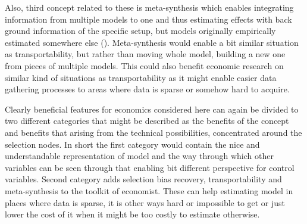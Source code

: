 \documentclass[main=english,12pt,a4paper,pdftex,econ,utf8]{aaltothesis}
\begin{document}
Also, third concept related to these is meta-synthesis which enables integrating information from multiple models to one and thus estimating effects with back ground information of the specific setup, but models originally empirically estimated somewhere else (\cite{Pearl2012a}). Meta-synthesis would enable a bit similar situation as transportability, but rather than moving whole model, building a new one from pieces of multiple models. This could also benefit economic research on similar kind of situations as transportability as it might enable easier data gathering processes to areas where data is sparse or somehow hard to acquire.

Clearly beneficial features for economics considered here can again be divided to two different categories that might be described as the benefits of the concept and benefits that arising from the technical possibilities, concentrated around the selection nodes. In short the first category would contain the nice and understandable representation of model and the way through which other variables can be seen through that enabling bit different perspective for control variables. Second category adds selection bias recovery, transportability and meta-synthesis to the toolkit of economist. These can help estimating model in places where data is sparse, it is other ways hard or impossible to get or just lower the cost of it when it might be too costly to estimate otherwise.

\begin{comment}
\hl{These} would enable using once done model in some place that must have same causal structure, but there might be some factors affecting the estimates differing from the original location to be used also in the second place. This would of course be again highly useful for economics and as selection recovery this might make implementing models for different settings much cheaper and thus also possible in smaller settings which might enable better policy recommendation and better decision making for smaller units such as municipalities. Also some complicated questions like how the social security system should be renewed in could be assessed more carefully with perhaps some research done in fairly similar setting in other country. Even thought this seems very promising and usable this is of course no silver bullet solving every problem. Even though there might be interesting use cases this requires the causal structure being exactly same to retain the causal interpretation and exactly same causal structures are of course in real world very hard to find.
\end{comment}
\end{document}
